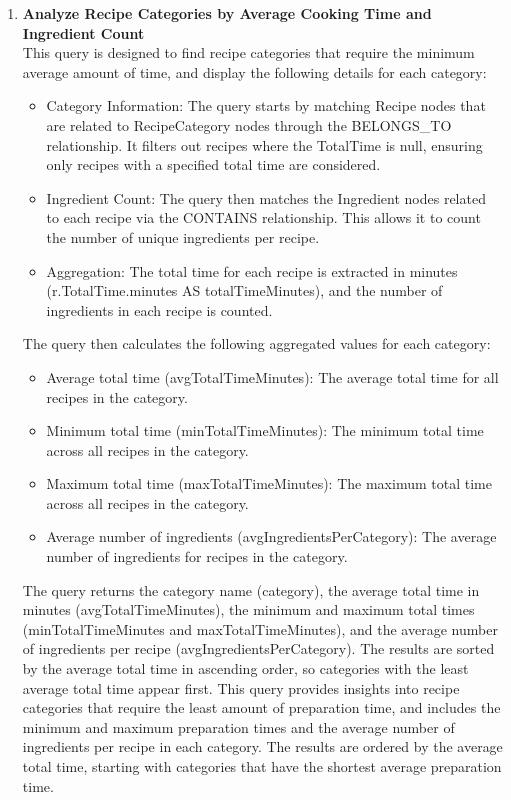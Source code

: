 \begin{enumerate}
    \clearpage
    \item \textbf{Analyze Recipe Categories by Average Cooking Time and Ingredient Count}\\
    This query is designed to find recipe categories that require the minimum average amount of time, and display the following details for each category:
    \begin{itemize}
        \item Category Information:
The query starts by matching Recipe nodes that are related to RecipeCategory nodes through the BELONGS\_TO relationship.
It filters out recipes where the TotalTime is null, ensuring only recipes with a specified total time are considered.
    \item Ingredient Count:
The query then matches the Ingredient nodes related to each recipe via the CONTAINS relationship. This allows it to count the number of unique ingredients per recipe.
    \item Aggregation:
The total time for each recipe is extracted in minutes (r.TotalTime.minutes AS totalTimeMinutes), and the number of ingredients in each recipe is counted.
    \end{itemize}
The query then calculates the following aggregated values for each category:
    \begin{itemize}
        \item Average total time (avgTotalTimeMinutes): The average total time for all recipes in the category.
        \item Minimum total time (minTotalTimeMinutes): The minimum total time across all recipes in the category.
        \item Maximum total time (maxTotalTimeMinutes): The maximum total time across all recipes in the category.
        \item Average number of ingredients (avgIngredientsPerCategory): The average number of ingredients for recipes in the category.
    \end{itemize}
The query returns the category name (category), the average total time in minutes (avgTotalTimeMinutes), the minimum and maximum total times (minTotalTimeMinutes and maxTotalTimeMinutes), and the average number of ingredients per recipe (avgIngredientsPerCategory).
The results are sorted by the average total time in ascending order, so categories with the least average total time appear first.
This query provides insights into recipe categories that require the least amount of preparation time, and includes the minimum and maximum preparation times and the average number of ingredients per recipe in each category. The results are ordered by the average total time, starting with categories that have the shortest average preparation time.

\end{enumerate}
